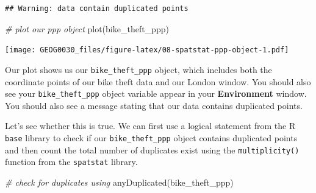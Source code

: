 \documentclass[
]{book}
\newenvironment{Shaded}{\begin{snugshade}}{\end{snugshade}}
\newcommand{\AttributeTok}[1]{\textcolor[rgb]{0.77,0.63,0.00}{#1}}
\newcommand{\CommentTok}[1]{\textcolor[rgb]{0.56,0.35,0.01}{\textit{#1}}}
\newcommand{\DecValTok}[1]{\textcolor[rgb]{0.00,0.00,0.81}{#1}}
\newcommand{\FunctionTok}[1]{\textcolor[rgb]{0.00,0.00,0.00}{#1}}
\newcommand{\NormalTok}[1]{#1}
\newcommand{\OtherTok}[1]{\textcolor[rgb]{0.56,0.35,0.01}{#1}}
\newcommand{\SpecialCharTok}[1]{\textcolor[rgb]{0.00,0.00,0.00}{#1}}
\begin{document}
\begin{Shaded}
\end{Shaded}

\begin{verbatim}
## Warning: data contain duplicated points
\end{verbatim}

\begin{Shaded}
\begin{Highlighting}[]
\CommentTok{\# plot our ppp object}
\FunctionTok{plot}\NormalTok{(bike\_theft\_ppp)}
\end{Highlighting}
\end{Shaded}

\texttt{[image: GEOG0030\_files/figure-latex/08-spatstat-ppp-object-1.pdf]}

Our plot shows us our \texttt{bike\_theft\_ppp} object, which includes both the coordinate points of our bike theft data and our London window. You should also see your \texttt{bike\_theft\_ppp} object variable appear in your \textbf{Environment} window. You should also see a message stating that our data contains duplicated points.

Let's see whether this is true. We can first use a logical statement from the R \texttt{base} library to check if our \texttt{bike\_theft\_ppp} object contains duplicated points and then count the total number of duplicates exist using the \texttt{multiplicity()} function from the \texttt{spatstat} library.

\begin{Shaded}
\begin{Highlighting}[]
\CommentTok{\# check for duplicates using}
\FunctionTok{anyDuplicated}\NormalTok{(bike\_theft\_ppp)}
\end{Highlighting}
\end{Shaded}
\end{document}
